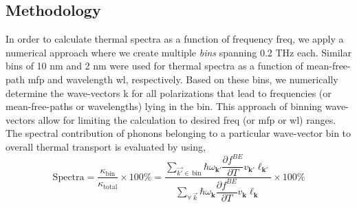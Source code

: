 \subsection{Methodology}
In order to calculate thermal spectra as a function of frequency \gls{freq}, we apply a numerical approach where we create multiple \textit{bins} spanning 0.2 THz each. Similar bins of 10 nm and 2 nm were used for thermal spectra as a function of mean-free-path \gls{mfp} and wavelength \gls{wl}, respectively. Based on these bins, we numerically determine the wave-vectors \gls{k} for all polarizations that lead to frequencies (or mean-free-paths or wavelengths) lying in the bin. This approach of binning wave-vectors allow for limiting the calculation to desired \gls{freq} (or \gls{mfp} or \gls{wl}) ranges. The spectral contribution of phonons belonging to a particular wave-vector bin to overall thermal transport is evaluated by using,
\begin{equation}
\mathrm{Spectra} =\dfrac{\kappa_\mathrm{bin}}{\kappa_\mathrm{total}}\times 100\% = \dfrac{\sum_{\vec{k'}\in\,\mathrm{bin}} \hbar\omega_{\mathbf{k'}}\dfrac{\partial f^{BE}}{\partial T}v_{\mathbf{k'}}\ell_{\mathbf{k'}}}{\sum_{\forall\,\vec{k}} \hbar\omega_{\mathbf{k}}\dfrac{\partial f^{BE}}{\partial T}v_{\mathbf{k}}\ell_{\mathbf{k}}}\times 100\%
\end{equation}


